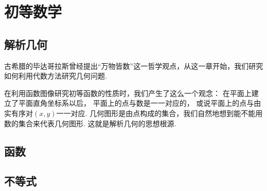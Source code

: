 \part{初等数学}
% 
% 

% 

\chapter{解析几何}
古希腊的毕达哥拉斯曾经提出“万物皆数”这一哲学观点，从这一章开始，我们研究如何利用代数方法研究几何问题.

在利用函数图像研究初等函数的性质时，我们产生了这么一个观念：
在平面上建立了平面直角坐标系以后，
平面上的点与数是一一对应的，
或说平面上的点与由实有序对\((x,y)\)一一对应.
几何图形是由点构成的集合，我们自然地想到能不能用数的集合来代表几何图形.
这就是解析几何的思想根源.



\chapter{函数}











% 





\chapter{不等式}



